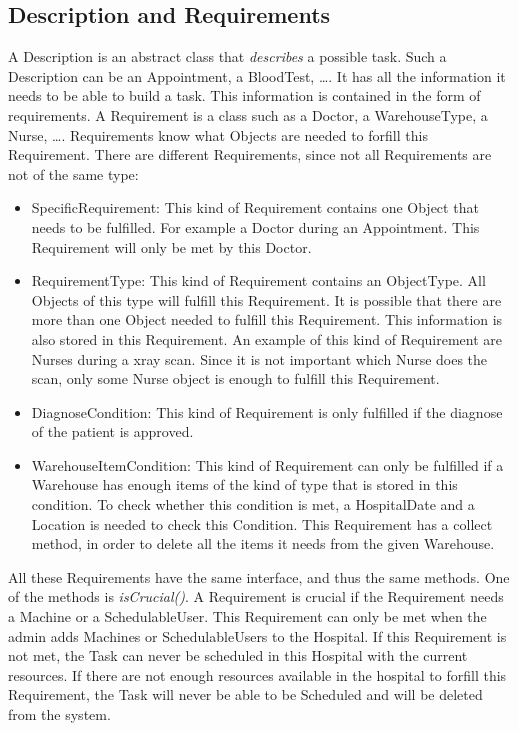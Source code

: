 \documentclass[12pt]{article}
\begin{document}
\subsection{Description and Requirements}
A Description is an abstract class that \textit{describes} a possible task. Such a Description can be an Appointment, a BloodTest, \dots.  It has all the information it needs to be able to build a task. This information is contained in the form of requirements. A Requirement is a class such as a Doctor, a WarehouseType, a Nurse, \dots. Requirements know what Objects are needed to forfill this Requirement. There are different Requirements, since not all Requirements are not of the same type:
\begin{itemize}
\item SpecificRequirement: This kind of Requirement contains one Object that needs to be fulfilled. For example a Doctor during an Appointment. This Requirement will only be met by this Doctor.
\item RequirementType: This kind of Requirement contains an ObjectType. All Objects of this type will fulfill this Requirement. It is possible that there are more than one Object needed to fulfill this Requirement. This information is also stored in this Requirement. An example of this kind of Requirement are Nurses during a xray scan. Since it is not important which Nurse does the scan, only some Nurse object is enough to fulfill this Requirement.
\item DiagnoseCondition: This kind of Requirement is only fulfilled if the diagnose of the patient is approved.
\item WarehouseItemCondition: This kind of Requirement can only be fulfilled if a Warehouse has enough items of the kind of type that is stored in this condition. To check whether this condition is met, a HospitalDate and a Location is needed to check this Condition. This Requirement has a collect method, in order to delete all the items it needs from the given Warehouse.
\end{itemize}
All these Requirements have the same interface, and thus the same methods. One of the methods is \textit{isCrucial()}. A Requirement is crucial if the Requirement needs a Machine or a SchedulableUser. This Requirement can only be met when the admin adds Machines or SchedulableUsers to the Hospital. If this Requirement is not met, the Task can never be scheduled in this Hospital with the current resources. If there are not enough resources available in the hospital to forfill this Requirement, the Task will never be able to be Scheduled and will be deleted from the system.
\end{document}
